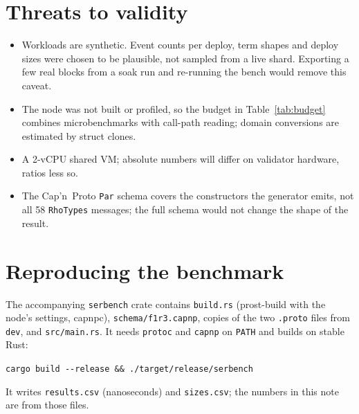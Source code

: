\documentclass[10pt,a4paper]{article}
\newcommand{\f}[1]{\nolinkurl{#1}}
\newcommand{\capnp}{Cap'n~Proto}
\begin{document}
\section{Threats to validity}\label{sec:validity}

\begin{itemize}
  \item Workloads are synthetic. Event counts per deploy, term shapes and deploy sizes were chosen
        to be plausible, not sampled from a live shard. Exporting a few real blocks from a soak run
        and re-running the bench would remove this caveat.
  \item The node was not built or profiled, so the budget in Table~\ref{tab:budget} combines
        micro\-benchmarks with call-path reading; domain conversions are estimated by struct
        clones.
  \item A 2-vCPU shared VM; absolute numbers will differ on validator hardware, ratios less so.
  \item The \capnp{} \f{Par} schema covers the constructors the generator emits, not all 58
        \f{RhoTypes} messages; the full schema would not change the shape of the result.
\end{itemize}

\appendix
\section{Reproducing the benchmark}
The accompanying \f{serbench} crate contains \f{build.rs} (prost-build with the node's settings,
capnpc), \f{schema/f1r3.capnp}, copies of the two \f{.proto} files from \f{dev}, and
\f{src/main.rs}. It needs \f{protoc} and \f{capnp} on \f{PATH} and builds on stable Rust:
\begin{center}\texttt{cargo build -{}-release \&\& ./target/release/serbench}\end{center}
It writes \f{results.csv} (nanoseconds) and \f{sizes.csv}; the numbers in this note are from
those files.
\end{document}
